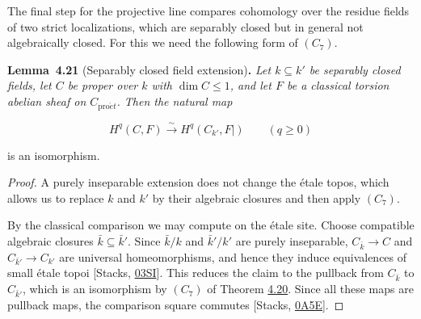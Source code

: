 \documentclass[11pt]{article}
\newenvironment{bpstatement}[2]{\par\addvspace{0.6\baselineskip}\noindent\textbf{#1}#2\textbf{.}\enspace\ignorespaces}
  {\par\addvspace{0.4\baselineskip}}
\newenvironment{bpstatementit}[2]{\begin{bpstatement}{#1}{#2}\itshape\ignorespaces}{\end{bpstatement}}
\begin{document}
\label{bp59}%
The final step for the projective line compares cohomology over the residue fields of two strict localizations, which are separably closed but in general not algebraically closed. For this we need the following form of \((C_7)\).

\label{bp60}%
\begin{bpstatementit}{Lemma~4.21}{ (Separably closed field extension)}
Let \(k\subseteq k'\) be separably closed fields, let \(C\) be proper over \(k\) with \(\dim C\leq1\), and let \(F\) be a classical torsion abelian sheaf on \(C_{\mathrm{pro}\acute{e}t}\). Then the natural map

\[
H^q(C,F)\xrightarrow{\sim}H^q(C_{k'},F|)
\qquad(q\geq0)
\]

is an isomorphism.
\end{bpstatementit}

\begin{proof}[{Proof}]\label{bp61}%
A purely inseparable extension does not change the étale topos, which allows us to replace \(k\) and \(k'\) by their algebraic closures and then apply \((C_7)\).

By the classical comparison we may compute on the étale site. Choose compatible algebraic closures \(\bar k\subseteq\bar k'\). Since \(\bar k/k\) and \(\bar k'/k'\) are purely inseparable, \(C_{\bar k}\to C\) and \(C_{\bar k'}\to C_{k'}\) are universal homeomorphisms, and hence they induce equivalences of small étale topoi [Stacks, \href{https://stacks.math.columbia.edu/tag/03SI}{03SI}]. This reduces the claim to the pullback from \(C_{\bar k}\) to \(C_{\bar k'}\), which is an isomorphism by \((C_7)\) of Theorem \hyperref[bp56]{4.20}. Since all these maps are pullback maps, the comparison square commutes [Stacks, \href{https://stacks.math.columbia.edu/tag/0A5E}{0A5E}].
\end{proof}
\end{document}
